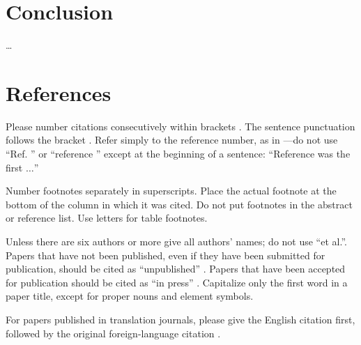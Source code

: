 \documentclass[conference]{IEEEtran}
\begin{document}
\section{Conclusion}
\dots

% 

\section*{References}

Please number citations consecutively within brackets \cite{b1}. The 
sentence punctuation follows the bracket \cite{b2}. Refer simply to the reference 
number, as in \cite{b3}---do not use ``Ref. \cite{b3}'' or ``reference \cite{b3}'' except at 
the beginning of a sentence: ``Reference \cite{b3} was the first $\ldots$''

Number footnotes separately in superscripts. Place the actual footnote at 
the bottom of the column in which it was cited. Do not put footnotes in the 
abstract or reference list. Use letters for table footnotes.

Unless there are six authors or more give all authors' names; do not use 
``et al.''. Papers that have not been published, even if they have been 
submitted for publication, should be cited as ``unpublished'' \cite{b4}. Papers 
that have been accepted for publication should be cited as ``in press'' \cite{b5}. 
Capitalize only the first word in a paper title, except for proper nouns and 
element symbols.

For papers published in translation journals, please give the English 
citation first, followed by the original foreign-language citation \cite{b6}.
\end{document}
